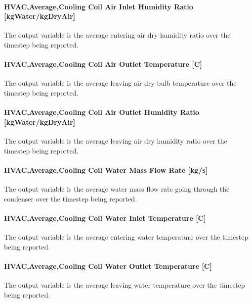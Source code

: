 \paragraph{HVAC,Average,Cooling Coil Air Inlet Humidity Ratio {[}kgWater/kgDryAir{]}}\label{vshpwhheating-output-cooling-coil-air-inlet-humidity-ratio}
The output variable is the average entering air dry humidity ratio over the timestep being reported.

\paragraph{HVAC,Average,Cooling Coil Air Outlet Temperature {[}C{]}}\label{vshpwhheating-output-cooling-coil-air-outlet-temperature}
The output variable is the average leaving air dry-bulb temperature over the timestep being reported.

\paragraph{HVAC,Average,Cooling Coil Air Outlet Humidity Ratio {[}kgWater/kgDryAir{]}}\label{vshpwhheating-output-cooling-coil-air-outlet-humidity-ratio}
The output variable is the average leaving air dry humidity ratio over the timestep being reported.

\paragraph{HVAC,Average,Cooling Coil Water Mass Flow Rate {[}kg/s{]}}\label{vshpwhheating-output-cooling-coil-water-mass-flow-rate}
The output variable is the average water mass flow rate going through the condenser over the timestep being reported.

\paragraph{HVAC,Average,Cooling Coil Water Inlet Temperature {[}C{]}}\label{vshpwhheating-output-cooling-coil-water-inlet-temperature}
The output variable is the average entering water temperature over the timestep being reported.

\paragraph{HVAC,Average,Cooling Coil Water Outlet Temperature {[}C{]}}\label{vshpwhheating-output-cooling-coil-water-outlet-temperature}
The output variable is the average leaving water temperature over the timestep being reported.

